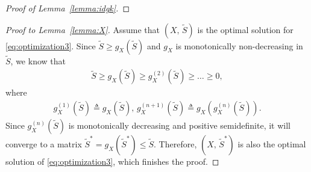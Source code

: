 \begin{proof}[Proof of Lemma~\ref{lemma:idgk}]
\end{proof}


\begin{proof}[Proof to Lemma~\ref{lemma:X}]
  Assume that $(X,\,\tilde S)$ is the optimal solution for \eqref{eq:optimization3}. Since $\tilde S\geq g_X(\tilde S)$ and $g_X$ is monotonically non-decreasing in $\tilde S$, we know that
  \begin{align*}
    \tilde S\geq g_X(\tilde S)\geq g_X^{(2)}(\tilde S)\geq \dots \geq 0,
  \end{align*}
  where 
  \begin{align*}
    g_X^{(1)}(\tilde S) \triangleq g_X(\tilde S),\, g_X^{(n+1)}(\tilde S) \triangleq g_X\left(g_X^{(n)}(\tilde S)\right).
  \end{align*}
  Since $g_X^{(n)}(\tilde S)$ is monotonically decreasing and positive semidefinite, it will converge to a matrix $\tilde S^* = g_X(\tilde S^*)\leq \tilde S$. Therefore, $(X,\,\tilde S^*)$ is also the optimal solution of \eqref{eq:optimization3}, which finishes the proof.
\end{proof}


